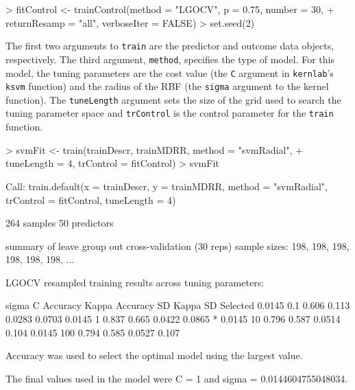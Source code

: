 \documentclass[12pt]{article}
\begin{document}
\begin{small}
\begin{Schunk}
\begin{Sinput}
> fitControl <- trainControl(method = "LGOCV", p = 0.75, number = 30, 
+     returnResamp = "all", verboseIter = FALSE)
> set.seed(2)
\end{Sinput}
\end{Schunk}
\end{small}


The first two arguments to \texttt{train} are the predictor and outcome data objects, respectively. The third argument, \texttt{method}, specifies the type of model. For this model, the tuning parameters are the cost value (the \texttt{C} argument in \texttt{kernlab}'s \texttt{ksvm} function) and the radius of the RBF (the \texttt{sigma} argument to the kernel function). The \texttt{tuneLength} argument sets the size of the grid used to search the tuning parameter space and \texttt{trControl} is the control parameter for the \texttt{train} function. 

\begin{small}
\begin{Schunk}
\begin{Sinput}
> svmFit <- train(trainDescr, trainMDRR, method = "svmRadial", 
+     tuneLength = 4, trControl = fitControl)
> svmFit
\end{Sinput}
\begin{Soutput}
Call:
train.default(x = trainDescr, y = trainMDRR, method = "svmRadial", 
    trControl = fitControl, tuneLength = 4)

264 samples
50 predictors

summary of leave group out cross-validation (30 reps) sample sizes:
    198, 198, 198, 198, 198, 198, ... 

LGOCV resampled training results across tuning parameters:

  sigma   C    Accuracy  Kappa  Accuracy SD  Kappa SD  Selected
  0.0145  0.1  0.606     0.113  0.0283       0.0703            
  0.0145  1    0.837     0.665  0.0422       0.0865    *       
  0.0145  10   0.796     0.587  0.0514       0.104             
  0.0145  100  0.794     0.585  0.0527       0.107             

Accuracy was used to select the optimal model using the largest value.

The final values used in the model were C = 1 and sigma = 0.0144604755048034.
\end{Soutput}
\end{Schunk}
\end{small}
\end{document}
